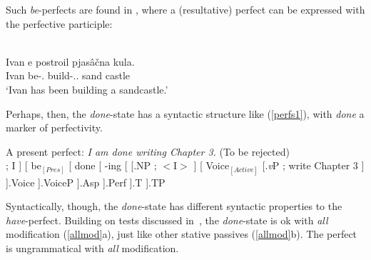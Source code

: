 \documentclass[output=paper]{langsci/langscibook}
\begin{document}
Such \emph{be}-perfects are found in , where a (resultative)
perfect can be expressed with the perfective participle:

\begin{exe}
    \ex {}\\
    \gll  Ivan e postroil pjas\^{a}\v{c}na kula. \\
    Ivan be-\Tsg.\Prs{} build-\Prf.\M.\Sg{} sand castle \\
    \trans `Ivan has been building a sandcastle.' \hfill{\citep[296]{Pancheva2003a}}
\end{exe}

Perhaps, then, the \emph{done}-state has a syntactic structure like
(\ref{perfs1}), with \emph{done} a marker of perfectivity.

\begin{exe}
\ex A present perfect: {\em I am done writing Chapter 3.} (To be
rejected)\label{perfs1}\\
\vspace{12pt}
    \Tree
        [
            [.NP \edge[roof]; {I} ]
            [
                be$_{[Pres]}$
                [
                    done
                    [
                        -ing
                        [
                            [.NP \edge[roof]; {$<$I$>$} ]
                            [
                                Voice$_{[Active]}$
                                [.\emph{v}P \edge[roof]; {write Chapter 3} ]
                            ].Voice
                        ].VoiceP
                    ].Asp
                ].Perf
            ].T
        ].TP
\end{exe}

Syntactically, though, the \emph{done}-state has different syntactic properties
to the  \emph{have}-perfect. Building on tests discussed
in~\cite{Fruehwald2015a}, the \emph{done}-state is ok with {\em all}
modification (\ref{allmod}a), just like other stative passives (\ref{allmod}b).
The perfect is ungrammatical with {\em all} modification.

\begin{exe}
\ex\label{allmod}
\begin{xlist}
\end{xlist}
\end{exe}
\end{document}
